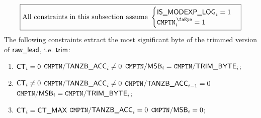 \[
    \boxed{\text{All constraints in this subsection assume }
        \begin{cases}
            \isModexpLog     _{i} = 1 \\
            \isComputation _{i} = 1   \\
        \end{cases}}
\]
The following constraints extract the most significant byte of the trimmed version of $\locRawLeadingWord$, i.e. $\locTrim$:
\begin{enumerate}
    \item \If $\ct_{i} = 0$ \et $\compTanzbAcc_{i} \neq 0$ \Then $\compMsb_{i} = \compTrimByte_{i}$;
    \item \If $\ct_{i} \neq 0$ \et $\compTanzbAcc_{i} \neq 0$ \et $\compTanzbAcc_{i-1} = 0$ \Then $\compMsb_{i} = \compTrimByte_{i}$;
    \item \If $\ct_{i} = \maxCt$ \et $\compTanzbAcc_{i} = 0$ \Then $\compMsb_{i} = 0$;
\end{enumerate}
